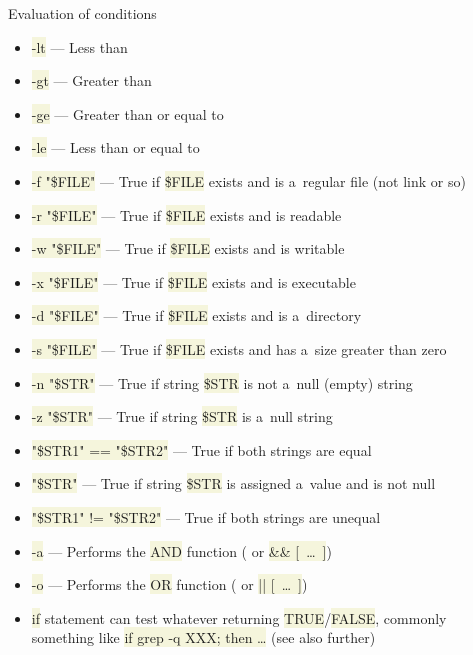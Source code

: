 \documentclass[compress, xelatex, 11pt, xcolor=svgnames, aspectratio=169,
	hyperref={
		bookmarks=true,
		unicode=true,
		colorlinks=true,
		pdftitle={Linux, command line and MetaCentrum},
		plainpages=false,
		pdfauthor={Vojtech Zeisek},
		pdfsubject={Course about use of Linux command line, writing shell scripts and using MetaCentrum of CESNET},
		pdfcreator={XeLaTeX},
		pdfkeywords={Linux, GNU, BASH, shell, command line, MetaCentrum},
		linkcolor=DarkRed, %
		anchorcolor=DarkBlue, %
		citecolor=Indigo, %
		filecolor=NavyBlue, %
		menucolor=DarkMagenta, %
		urlcolor=DarkBlue, %
		},
	url={hyphens, lowtilde} %
	]{beamer}
\renewcommand{\texttt}[1]{\colorbox{Beige}{{\ttfamily #1}}}
\begin{document}
\begin{frame}[allowframebreaks]{Evaluation of conditions}
\begin{itemize}
		\item \texttt{-lt} --- Less than
		\item \texttt{-gt} --- Greater than
		\item \texttt{-ge} --- Greater than or equal to
		\item \texttt{-le} --- Less than or equal to
		\item \texttt{-f "\$\textbraceleft FILE\textbraceright "} --- True if \texttt{\$FILE} exists and is a~regular file (not link or so)
		\item \texttt{-r "\$\textbraceleft FILE\textbraceright "} --- True if \texttt{\$FILE} exists and is readable
		\item \texttt{-w "\$\textbraceleft FILE\textbraceright "} --- True if \texttt{\$FILE} exists and is writable
		\item \texttt{-x "\$\textbraceleft FILE\textbraceright "} --- True if \texttt{\$FILE} exists and is executable
		\item \texttt{-d "\$\textbraceleft FILE\textbraceright "} --- True if \texttt{\$FILE} exists and is a~directory
		\item \texttt{-s "\$\textbraceleft FILE\textbraceright "} --- True if \texttt{\$FILE} exists and has a~size greater than zero
		\item \texttt{-n "\$\textbraceleft STR\textbraceright "} --- True if string \texttt{\$STR} is not a~null (empty) string
		\item \texttt{-z "\$\textbraceleft STR\textbraceright "} --- True if string \texttt{\$STR} is a~null string
		\item \texttt{"\$\textbraceleft STR1\textbraceright " == "\$\textbraceleft STR2\textbraceright "} --- True if both strings are equal
		\item \texttt{"\$\textbraceleft STR\textbraceright "} --- True if string \texttt{\$STR} is assigned a~value and is not null
		\item \texttt{"\$\textbraceleft STR1\textbraceright " != "\$\textbraceleft STR2\textbraceright "} --- True if both strings are unequal
		\item \texttt{-a} --- Performs the \texttt{AND} function (\texttt{[~\ldots~-a~\ldots~]} or \texttt{[~\ldots~] \&\& [~\ldots~]})
		\item \texttt{-o} --- Performs the \texttt{OR} function (\texttt{[~\ldots~-o~\ldots~]} or \texttt{[~\ldots~] || [~\ldots~]})
		\item \texttt{if} statement can test whatever returning \texttt{TRUE}/\texttt{FALSE}, commonly something like \texttt{if grep -q XXX; then \ldots} (see also further)

\end{itemize}
\end{frame}
\end{document}

